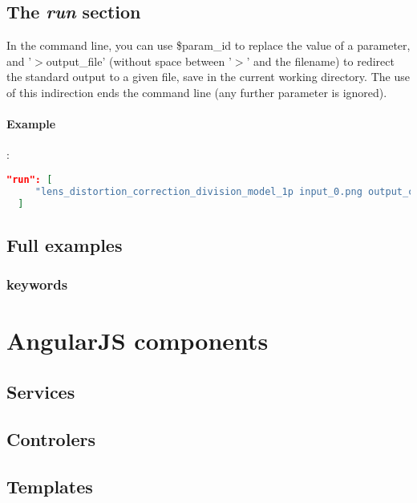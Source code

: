\subsection{The \emph{run} section}

In the command line, you can use \$param\_id to replace the value of a parameter,
and '$>$output\_file' (without space between '$>$' and the filename) to redirect the
standard output to a given file, save in the current working directory. The use
of this indirection ends the command line (any further parameter is ignored).

\paragraph{Example}:\\
\begin{lstlisting}[language=json,firstnumber=1]
  "run": [
     "lens_distortion_correction_division_model_1p input_0.png output_canny.png output_hough.png output_corrected_image.png $high_threshold_canny $initial_distortion_parameter $final_distortion_parameter $distance_point_line_max_hough $angle_point_orientation_max_difference primitives.txt"
  ]
\end{lstlisting}

\subsection{Full examples}


\subsubsection{keywords}

\section{AngularJS components}
\subsection{Services}
\subsection{Controlers}
\subsection{Templates}
